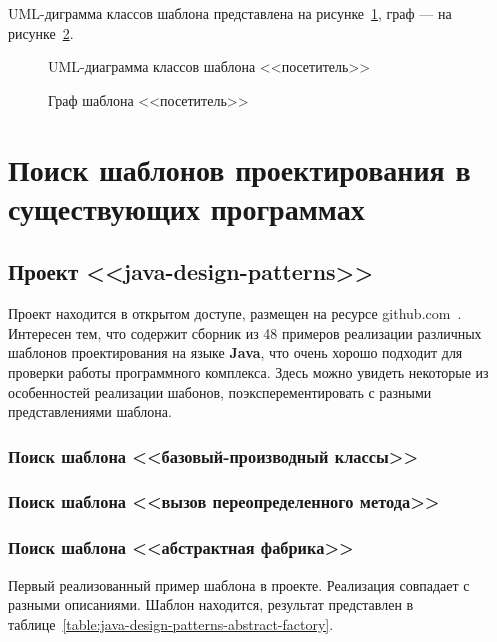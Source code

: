 UML-диграмма классов шаблона представлена на рисунке~\ref{fig:visitor-uml},
граф --- на рисунке~\ref{fig:visitor-graph}.

\begin{figure}[!ht]
\centering
\caption{UML-диаграмма классов шаблона <<посетитель>>}
\label{fig:visitor-uml}
\end{figure}

\begin{figure}[!ht]
\centering
\caption{Граф шаблона <<посетитель>>}
\label{fig:visitor-graph}
\end{figure}

\section{Поиск шаблонов проектирования в существующих программах}

\subsection{Проект <<java-design-patterns>>}

Проект находится в открытом доступе, размещен на ресурсе
github.com~\cite{java-design-patterns}.
Интересен тем, что содержит сборник из 48 примеров реализации различных
шаблонов проектирования на языке \textbf{Java},
что очень хорошо подходит для проверки работы программного комплекса.
Здесь можно увидеть некоторые из особенностей реализации шабонов,
поэксперементировать с разными представлениями шаблона.

\subsubsection{Поиск шаблона <<базовый-производный классы>>}

\subsubsection{Поиск шаблона <<вызов переопределенного метода>>}

\subsubsection{Поиск шаблона <<абстрактная фабрика>>}

Первый реализованный пример шаблона в проекте.
Реализация совпадает с разными описаниями.
Шаблон находится, результат представлен в таблице~\ref{table:java-design-patterns-abstract-factory}.

